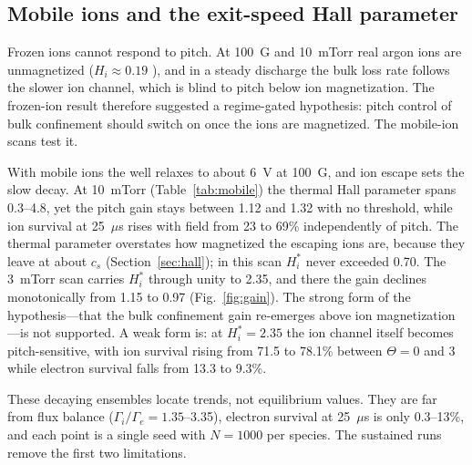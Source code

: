 \documentclass[11pt]{article}
\newcommand{\us}{\ensuremath{\mu}s}
\begin{document}
\subsection{Mobile ions and the exit-speed Hall parameter}
\label{sec:mobile}

Frozen ions cannot respond to pitch. At 100~G and 10~mTorr real argon ions are unmagnetized ($H_i \approx 0.19$ \cite{auerbach2026}), and in a steady discharge the bulk loss rate follows the slower ion channel, which is blind to pitch below ion magnetization. The frozen-ion result therefore suggested a regime-gated hypothesis: pitch control of bulk confinement should switch on once the ions are magnetized. The mobile-ion scans test it.

With mobile ions the well relaxes to about 6~V at 100~G, and ion escape sets the slow decay. At 10~mTorr (Table~\ref{tab:mobile}) the thermal Hall parameter spans 0.3--4.8, yet the pitch gain stays between 1.12 and 1.32 with no threshold, while ion survival at 25~\us{} rises with field from 23 to 69\% independently of pitch. The thermal parameter overstates how magnetized the escaping ions are, because they leave at about $c_s$ (Section~\ref{sec:hall}); in this scan $H_i^*$ never exceeded 0.70. The 3~mTorr scan carries $H_i^*$ through unity to 2.35, and there the gain declines monotonically from 1.15 to 0.97 (Fig.~\ref{fig:gain}). The strong form of the hypothesis---that the bulk confinement gain re-emerges above ion magnetization---is not supported. A weak form is: at $H_i^* = 2.35$ the ion channel itself becomes pitch-sensitive, with ion survival rising from 71.5 to 78.1\% between $\Theta = 0$ and 3 while electron survival falls from 13.3 to 9.3\%.

These decaying ensembles locate trends, not equilibrium values. They are far from flux balance ($\Gamma_i/\Gamma_e = 1.35$--3.35), electron survival at 25~\us{} is only 0.3--13\%, and each point is a single seed with $N = 1000$ per species. The sustained runs remove the first two limitations.
\end{document}
